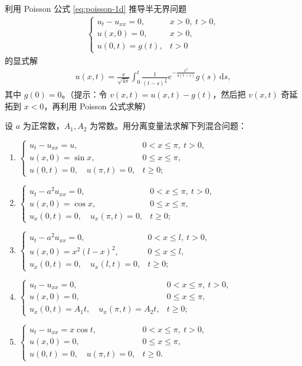 \documentclass[../../main.tex]{subfiles}%
\begin{document}
\begin{example}
利用 Poisson 公式 \eqref{eq:poisson-1d} 推导半无界问题
\begin{align*}
\begin{cases}
u_t-u_{xx}=0, & x>0,\ t>0,\\
u(x,0)=0, & x>0,\\
u(0,t)=g(t), & t>0
\end{cases}
\end{align*}
的显式解
\begin{align*}
u(x,t)=\frac{x}{\sqrt{4\pi}}\int_0^t \frac{1}{(t-s)^{\frac{3}{2}}}e^{-\frac{x^2}{4(t-s)}}g(s)\,\mathrm{d}s,
\end{align*}
其中 $g(0)=0$。（提示：令 $v(x,t)=u(x,t)-g(t)$，然后把 $v(x,t)$ 奇延拓到 $x<0$，再利用 Poisson 公式求解）
\end{example}

\begin{example}
设 $a$ 为正常数，$A_1,A_2$ 为常数。用分离变量法求解下列混合问题：
\begin{enumerate}[(1)]
\item $\begin{cases}
u_t-u_{xx}=u, & 0<x\leqslant\pi,\ t>0,\\
u(x,0)=\sin x, & 0\leqslant x\leqslant\pi,\\
u(0,t)=0,\quad u(\pi,t)=0, & t\geqslant 0;
\end{cases}$
\item $\begin{cases}
u_t-a^2u_{xx}=0, & 0<x\leqslant\pi,\ t>0,\\
u(x,0)=\cos x, & 0\leqslant x\leqslant\pi,\\
u_x(0,t)=0,\quad u_x(\pi,t)=0, & t\geqslant 0;
\end{cases}$
\item $\begin{cases}
u_t-a^2u_{xx}=0, & 0<x\leqslant l,\ t>0,\\
u(x,0)=x^2(l-x)^2, & 0\leqslant x\leqslant l,\\
u_x(0,t)=0,\quad u_x(l,t)=0, & t\geqslant 0;
\end{cases}$
\item $\begin{cases}
u_t-u_{xx}=0, & 0<x\leqslant\pi,\ t>0,\\
u(x,0)=0, & 0\leqslant x\leqslant\pi,\\
u_x(0,t)=A_1t,\quad u_x(\pi,t)=A_2t, & t\geqslant 0;
\end{cases}$
\item $\begin{cases}
u_t-u_{xx}=x\cos t, & 0<x\leqslant\pi,\ t>0,\\
u(x,0)=0, & 0\leqslant x\leqslant\pi,\\
u(0,t)=0,\quad u(\pi,t)=0, & t\geqslant 0.
\end{cases}$
\end{enumerate}
\end{example}
\end{document}
